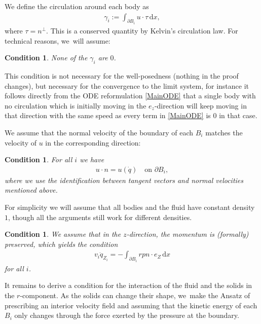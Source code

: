 \documentclass[10pt]{amsart}
\newtheorem{condition}[theorem]{Condition}
\theoremstyle{definition}
\newcommand\eq{=}
\newcommand\dd{\,\mathrm{d}}
\newcommand\dx{\dd x}
\let\de\partial
\begin{document}
We define the circulation around each body as
\begin{align*}
\gamma_i:=\int_{\de B_i}u\cdot\tau\dx,
\end{align*}
where $\tau=n^\perp$. This is a conserved quantity by Kelvin's circulation law. For technical reasons, we~will assume:
\begin{condition}\label{cond:103}
None of the $\gamma_i$ are $0$.
\end{condition}

This condition is not necessary for the well-posedness (nothing in the proof changes),
but necessary for the convergence to the limit system, for instance it follows directly from the
ODE reformulation \eqref{MainODE} that a single body with no circulation which is initially moving in the $e_z$-direction will keep moving in that direction with the same speed as every term
in \eqref{MainODE} is 0 in that case.

We assume that the normal velocity of the boundary of each $B_i$ matches the velocity of $u$ in the corresponding direction:
\begin{condition} For all $i$ we have
\begin{align}
u\cdot n\eq u(\dot{q}) \quad\text{on $\de B_i$}\label{Euler5},
\end{align}
where we use the identification between tangent vectors and normal velocities mentioned above.
\end{condition}

For simplicity we will assume that all bodies and the fluid have constant density~$1$, though all the arguments still work for different densities.

\begin{condition} We assume that in the $z$-direction, the momentum is (formally) preserved, which yields the condition
\begin{align}
v_i\ddot{q}_{{Z}_i}\eq-\int_{\de B_i}rpn\cdot e_Z\dx\label{eq z}
\end{align}
for all $i$.
\end{condition}

It remains to derive a condition for the interaction of the fluid and the solids in the $r$-component. As the solids can change their shape, we~make the Ansatz of prescribing an interior velocity field and assuming that the kinetic energy of each $B_i$ only changes through the force exerted by the pressure at the boundary.
\end{document}
